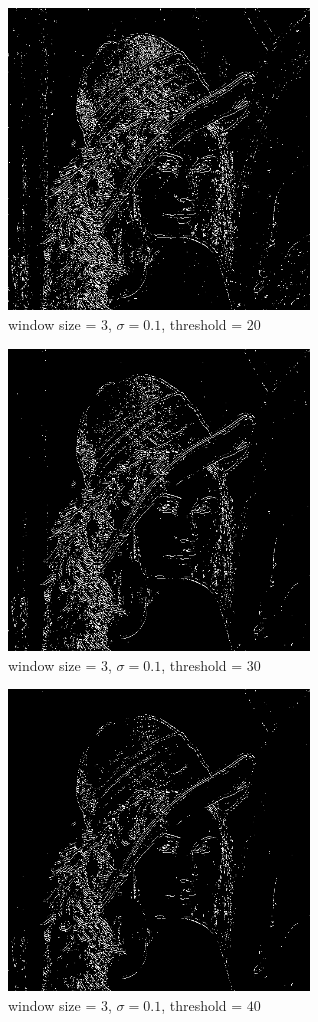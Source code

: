 \documentclass[conference]{IEEEtran}
\begin{document}
\begin{figure}[H]
\centerline{\includegraphics[width=8cm]{lena01.png}}
\caption{window size = $3$, $\sigma=0.1$,  threshold = $20$}
\label{lena01}
\end{figure}

\begin{figure}[H]
\centerline{\includegraphics[width=8cm]{lena02.png}}
\caption{window size = $3$, $\sigma=0.1$,  threshold = $30$}
\label{len02}
\end{figure}

\begin{figure}[H]
\centerline{\includegraphics[width=8cm]{lena03.png}}
\caption{window size = $3$, $\sigma=0.1$,  threshold = $40$}
\label{lena03}
\end{figure}
\end{document}
